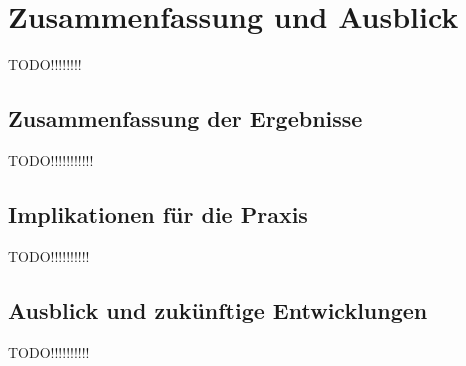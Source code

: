 
\chapter{Zusammenfassung und Ausblick} 

TODO!!!!!!!!

\section{Zusammenfassung der Ergebnisse}  \label{Zusammenfassung der Ergebnisse}

TODO!!!!!!!!!!!

\section{Implikationen für die Praxis}  \label{Implikationen für die Praxis}

TODO!!!!!!!!!!

\section{Ausblick und zukünftige Entwicklungen}  \label{Ausblick und zukünftige Entwicklungen}

TODO!!!!!!!!!!